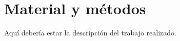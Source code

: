 \chapter{Material y métodos}
\label{material_y_metodos}

Aquí debería estar la descripción del trabajo realizado.
